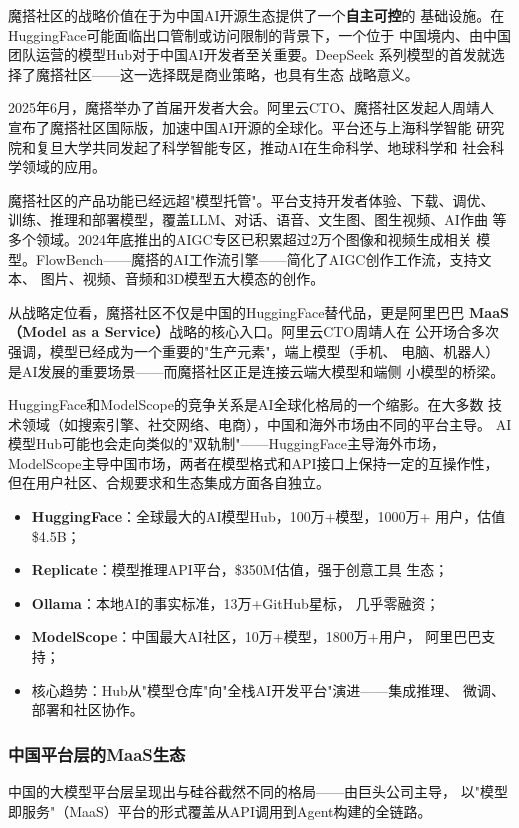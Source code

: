 魔搭社区的战略价值在于为中国AI开源生态提供了一个\textbf{自主可控}的
基础设施。在HuggingFace可能面临出口管制或访问限制的背景下，一个位于
中国境内、由中国团队运营的模型Hub对于中国AI开发者至关重要。DeepSeek
系列模型的首发就选择了魔搭社区——这一选择既是商业策略，也具有生态
战略意义。

2025年6月，魔搭举办了首届开发者大会。阿里云CTO、魔搭社区发起人周靖人
宣布了魔搭社区国际版，加速中国AI开源的全球化。平台还与上海科学智能
研究院和复旦大学共同发起了科学智能专区，推动AI在生命科学、地球科学和
社会科学领域的应用。

魔搭社区的产品功能已经远超"模型托管"。平台支持开发者体验、下载、调优、
训练、推理和部署模型，覆盖LLM、对话、语音、文生图、图生视频、AI作曲
等多个领域。2024年底推出的AIGC专区已积累超过2万个图像和视频生成相关
模型。FlowBench——魔搭的AI工作流引擎——简化了AIGC创作工作流，支持文本、
图片、视频、音频和3D模型五大模态的创作。

从战略定位看，魔搭社区不仅是中国的HuggingFace替代品，更是阿里巴巴
\textbf{MaaS（Model as a Service）}战略的核心入口。阿里云CTO周靖人在
公开场合多次强调，模型已经成为一个重要的"生产元素"，端上模型（手机、
电脑、机器人）是AI发展的重要场景——而魔搭社区正是连接云端大模型和端侧
小模型的桥梁。

HuggingFace和ModelScope的竞争关系是AI全球化格局的一个缩影。在大多数
技术领域（如搜索引擎、社交网络、电商），中国和海外市场由不同的平台主导。
AI模型Hub可能也会走向类似的"双轨制"——HuggingFace主导海外市场，
ModelScope主导中国市场，两者在模型格式和API接口上保持一定的互操作性，
但在用户社区、合规要求和生态集成方面各自独立。

\begin{corebox}[Hub与社区的全球格局]
\begin{itemize}
  \item \textbf{HuggingFace}：全球最大的AI模型Hub，100万+模型，1000万+
    用户，估值\$4.5B；
  \item \textbf{Replicate}：模型推理API平台，\$350M估值，强于创意工具
    生态；
  \item \textbf{Ollama}：本地AI的事实标准，13万+GitHub星标，
    几乎零融资；
  \item \textbf{ModelScope}：中国最大AI社区，10万+模型，1800万+用户，
    阿里巴巴支持；
  \item 核心趋势：Hub从"模型仓库"向"全栈AI开发平台"演进——集成推理、
    微调、部署和社区协作。
\end{itemize}
\end{corebox}

\subsubsection{中国平台层的MaaS生态}
中国的大模型平台层呈现出与硅谷截然不同的格局——由巨头公司主导，
以"模型即服务"（MaaS）平台的形式覆盖从API调用到Agent构建的全链路。

